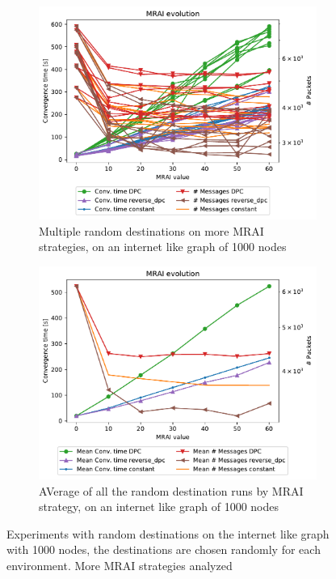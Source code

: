 \documentclass[10pt,conference,letterpaper]{IEEEtran}
\newcommand{\figwidth}{0.78}
\newcommand{\figvspace}{-1.5em}
\begin{document}
\begin{figure}[tb]
	\centering

	\begin{subfigure}{\columnwidth}
		\centering
		\includegraphics[width=\figwidth\columnwidth]{images/different_destinations/different_destinations-1000_all}
		\caption{Multiple random destinations on more \ac{MRAI} strategies, on an internet like graph of \num{1000} nodes}
		\label{fig:different_destinations-1000_all}
		\qquad
	\end{subfigure}

	\begin{subfigure}{\columnwidth}
		\centering
		\includegraphics[width=\figwidth\columnwidth]{images/different_destinations/different_destinations-1000_mean.pdf}
		\caption{AVerage of all the random destination runs by \ac{MRAI} strategy, on an internet like graph of \num{1000} nodes}
		\label{fig:different_destinations-1000_mean}
		\qquad
	\end{subfigure}

	\caption{Experiments with random destinations on the internet like graph with
		\num{1000} nodes, the destinations are chosen randomly for each environment.
		More \ac{MRAI} strategies analyzed}
	\label{fig:different_destinations-1000}
	\vspace{\figvspace}
\end{figure}
\end{document}
